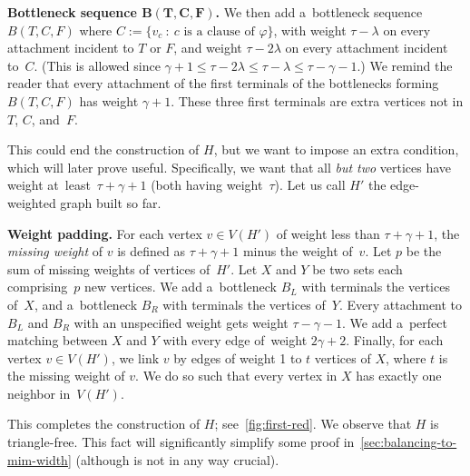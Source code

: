 \documentclass[a4paper,UKenglish,cleveref,hyperref,autoref]{lipics-v2021}
\begin{document}
\medskip

\textbf{Bottleneck sequence $\bm{B(T,C,F)}$.}
We then add a~bottleneck sequence $B(T,C,F)$ where $C := \{v_c \ : \ c\text{ is a clause of } \varphi \}$, with weight $\tau - \lambda$ on every attachment incident to $T$ or $F$, and weight $\tau - 2\lambda$ on every attachment incident to~$C$.
(This is allowed since $\gamma + 1 \leqslant \tau - 2\lambda \leqslant \tau - \lambda \leqslant \tau - \gamma - 1$.)
We remind the reader that every attachment of the first terminals of the bottlenecks forming $B(T,C,F)$ has weight $\gamma+1$.
These three first terminals are extra vertices not in $T$, $C$, and~$F$.

\medskip

This could end the construction of $H$, but we want to impose an extra condition, which will later prove useful.
Specifically, we want that all \emph{but two} vertices have weight at~least~$\tau + \gamma + 1$ (both having weight~$\tau$).
Let us call $H'$ the edge-weighted graph built so far. 

\medskip

\textbf{Weight padding.}
For each vertex $v \in V(H')$ of weight less than $\tau + \gamma + 1$, the \emph{missing weight} of $v$ is defined as $\tau + \gamma + 1$ minus the weight of~$v$.
Let $p$ be the sum of missing weights of vertices of~$H'$.
Let $X$ and $Y$ be two sets each comprising~$p$ new vertices.
We add a~bottleneck $B_L$ with terminals the vertices of~$X$, and a~bottleneck $B_R$ with terminals the vertices of~$Y$.
Every attachment to $B_L$ and $B_R$ with an unspecified weight gets weight $\tau - \gamma - 1$.
We add a~perfect matching between $X$ and $Y$ with every edge of~weight $2 \gamma + 2$.
Finally, for each vertex $v \in V(H')$, we link $v$ by edges of weight 1 to $t$ vertices of $X$, where $t$ is the missing weight of $v$.
We do so such that every vertex in $X$ has exactly one neighbor in~$V(H')$.

This completes the construction of $H$; see~\cref{fig:first-red}.
We observe that $H$ is triangle-free.
This fact will significantly simplify some proof in~\cref{sec:balancing-to-mim-width} (although is not in any way crucial).
\end{document}
